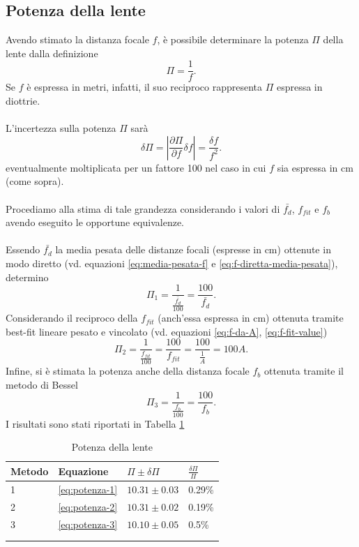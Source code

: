 \documentclass[11pt,a4paper]{article}
\begin{document}
\subsection{Potenza della lente}
Avendo stimato la distanza focale $f$, è possibile determinare la potenza $\Pi$ della lente dalla definizione
\begin{equation}
    \Pi = \frac{1}{f}.
\end{equation}
Se $f$ è espressa in metri, infatti, il suo reciproco rappresenta $\Pi$ espressa in diottrie. 
\\ \\
L'incertezza sulla potenza $\Pi$ sarà
\begin{equation}
    \delta \Pi = \left | \frac{\partial \Pi}{\partial f} \delta f \right | = \frac{\delta f}{f^2}.
\end{equation}
eventualmente moltiplicata per un fattore 100 nel caso in cui $f$ sia espressa in cm (come sopra).
\\ \\
Procediamo alla stima di tale grandezza considerando i valori di $\bar{f_d}$, $f_{fit}$ e $f_b$ avendo eseguito le opportune equivalenze. 
\\ \\
Essendo $\bar{f_d}$ la media pesata delle distanze focali (espresse in cm) ottenute in modo diretto (vd. equazioni \ref{eq:media-pesata-f} e \ref{eq:f-diretta-media-pesata}), determino
\begin{equation}
    \Pi_1 = \frac{1}{\frac{\bar{f_d}}{100}} = \frac{100}{\bar{f_d}}.
    \label{eq:potenza-1}
\end{equation}
Considerando il reciproco della $f_{fit}$ (anch'essa espressa in cm) ottenuta tramite best-fit lineare pesato e vincolato (vd. equazioni \ref{eq:f-da-A}, \ref{eq:f-fit-value})
\begin{equation}
    \Pi_2 = \frac{1}{\frac{f_{fit}}{100}} = \frac{100}{f_{fit}} = \frac{100}{\frac{1}{A}} = 100 A.
    \label{eq:potenza-2}
\end{equation}
Infine, si è stimata la potenza anche della distanza focale $f_b$ ottenuta tramite il metodo di Bessel
\begin{equation}
    \Pi_3 = \frac{1}{\frac{f_{b}}{100}} = \frac{100}{f_{b}}.
    \label{eq:potenza-3}
\end{equation}
I risultati sono stati riportati in Tabella \ref{tab:potenza}
\begin{longtable}{@{}llll@{}}
\toprule
Metodo & Equazione & $\Pi \pm \delta \Pi$ & $\frac{\delta \Pi}{\Pi}$ \tabularnewline
\midrule
1 & \ref{eq:potenza-1} & $10.31 \pm 0.03$ & 0.29\% \tabularnewline
2 & \ref{eq:potenza-2} & $10.31 \pm 0.02$ & 0.19\% \tabularnewline
3 & \ref{eq:potenza-3} & $10.10 \pm 0.05$ & 0.5\% \tabularnewline
\bottomrule
\label{tab:potenza}
\\
\caption{Potenza della lente}
\end{longtable}
\end{document}
